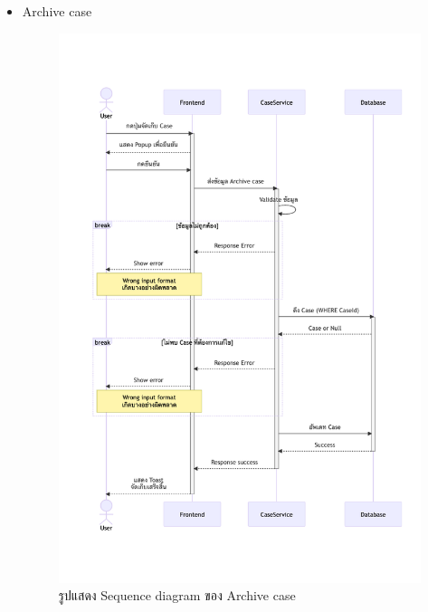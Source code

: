 \documentclass[12pt,oneside,openright,a4paper]{cpe-thai-project}
\begin{document}
\begin{itemize}
    \newpage
    \item Archive case \\
    \begin{figure}[!ht]\centering
        \includegraphics[width=13cm, trim={0 3cm 0 3cm},clip]{./assets/sequence-diagram/archive-case.png}
        \caption{รูปแสดง Sequence diagram ของ Archive case}\label{fig:sqArchiveCase}
    \end{figure}


\end{itemize}
\end{document}
